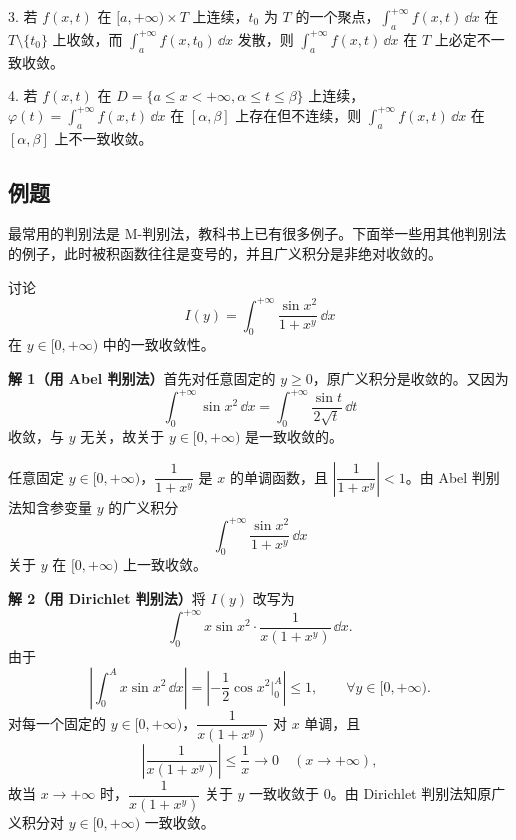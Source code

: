 3. 若 $f(x,t)$ 在 $[a,+\infty)\times T$ 上连续，$t_0$ 为 $T$ 的一个聚点，$\displaystyle\int_a^{+\infty}f(x,t)\,\dd x$ 在 $T\setminus\{t_0\}$ 上收敛，而 $\displaystyle\int_a^{+\infty}f(x,t_0)\,\dd x$ 发散，则 $\displaystyle\int_a^{+\infty}f(x,t)\,\dd x$ 在 $T$ 上必定不一致收敛。

4. 若 $f(x,t)$ 在 $D=\{a\leqslant x<+\infty,\alpha\leqslant t\leqslant\beta\}$ 上连续，$\varphi(t)=\displaystyle\int_a^{+\infty}f(x,t)\,\dd x$ 在 $[\alpha,\beta]$ 上存在但不连续，则 $\displaystyle\int_a^{+\infty}f(x,t)\,\dd x$ 在 $[\alpha,\beta]$ 上不一致收敛。

\subsection{例题}

最常用的判别法是 M-判别法，教科书上已有很多例子。下面举一些用其他判别法的例子，此时被积函数往往是变号的，并且广义积分是非绝对收敛的。

\begin{xexample}[23.2.1]
讨论
\[
  I(y)=\int_0^{+\infty}\frac{\sin x^2}{1+x^y}\,\dd x
\]
在 $y\in[0,+\infty)$ 中的一致收敛性。
\end{xexample}
\begin{xsolution}
\textbf{解 1（用 Abel 判别法）}\quad 首先对任意固定的 $y\geqslant0$，原广义积分是收敛的。又因为
\[
  \int_0^{+\infty}\sin x^2\,\dd x=\int_0^{+\infty}\frac{\sin t}{2\sqrt t}\,\dd t
\]
收敛，与 $y$ 无关，故关于 $y\in[0,+\infty)$ 是一致收敛的。

任意固定 $y\in[0,+\infty)$，$\dfrac1{1+x^y}$ 是 $x$ 的单调函数，且 $\left|\dfrac1{1+x^y}\right|<1$。由 Abel 判别法知含参变量 $y$ 的广义积分
\[
  \int_0^{+\infty}\frac{\sin x^2}{1+x^y}\,\dd x
\]
关于 $y$ 在 $[0,+\infty)$ 上一致收敛。

\textbf{解 2（用 Dirichlet 判别法）}\quad 将 $I(y)$ 改写为
\[
  \int_0^{+\infty}x\sin x^2\cdot\frac1{x(1+x^y)}\,\dd x.
\]
由于
\[
  \left|\int_0^A x\sin x^2\,\dd x\right|=\left|-\frac12\cos x^2\Big|_0^A\right|\leqslant1,
  \qquad \forall y\in[0,+\infty).
\]
对每一个固定的 $y\in[0,+\infty)$，$\dfrac1{x(1+x^y)}$ 对 $x$ 单调，且
\[
  \left|\frac1{x(1+x^y)}\right|\leqslant\frac1x\to0\quad(x\to+\infty),
\]
故当 $x\to+\infty$ 时，$\dfrac1{x(1+x^y)}$ 关于 $y$ 一致收敛于 0。由 Dirichlet 判别法知原广义积分对 $y\in[0,+\infty)$ 一致收敛。
\end{xsolution}

